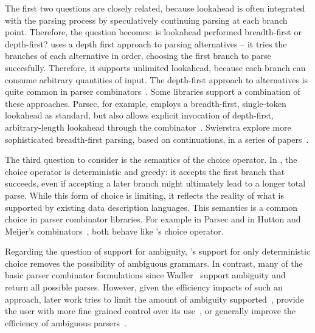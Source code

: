 The first two questions are closely related, because lookahead is often integrated with the parsing process by speculatively continuing parsing at each branch point. Therefore, the question becomes: is lookahead performed breadth-first or depth-first? \ddc{} uses a depth first approach to parsing alternatives -- it tries the branches of each alternative in order, choosing the first branch to parse succesfully. Therefore, it supports unlimited lookahead, because each branch can consume arbitrary quantities of input. The depth-first approach to alternatives is quite common in parser combinators~\cite{wadler:failure-successes,hutton:higher-order-parsing,hutton+:monadic-parsing,fokker:functional-parsers}. Some libraries support a combination of these approaches. Parsec, for example, employs a breadth-first, single-token lookahead as standard, but also allows explicit invocation of depth-first, arbitrary-length lookahead through the  combinator~\cite{leijen+:parsec}. Swierstra \etal{} explore more sophisticated breadth-first parsing, based on continuations, in a series of papers~\cite{swierstra+:fast-error-correcting,swierstra:toys-parsing,hughes+:polish-parsing}.

The third question to consider is the semantics of the choice operator. In \ddc{}, the choice operator is deterministic and greedy: it accepts the first branch that succeeds, even if accepting a later branch might ultimately lead to a longer total parse. While this form of choice is limiting, it reflects the reality of what is supported by existing data description languages. 
This semantics is a common choice in parser combinator libraries.  
For example  in Parsec and  in Hutton and 
Meijer's combinators~\cite{hutton+:monadic-parsing}, both behave like 
\ddc{}'s choice operator.

Regarding the question of support for ambiguity, \ddc{}'s support for only deterministic choice removes the possibility of ambiguous grammars. In contrast, many of the basic parser combinator formulations since Wadler~\cite{wadler:failure-successes} support ambiguity and return all possible parses. However, given the efficiency impacts of such an approach, later work tries to limit the amount of ambiguity supported~\cite{swierstra+:deterministic-error-correcting,leijen+:parsec}, provide the user with more fine grained control over its use~\cite{hughes+:polish-parsing}, or generally improve the efficiency of ambiguous parsers~\cite{peake+:earley-cps,frost+:padl-pcombs}.

